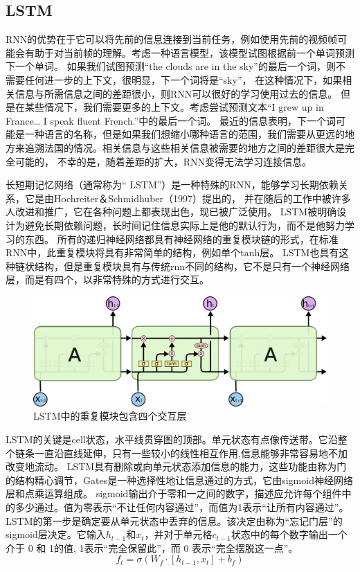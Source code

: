   
  \subsection{LSTM}
  RNN的优势在于它可以将先前的信息连接到当前任务，例如使用先前的视频帧可能会有助于对当前帧的理解。考虑一种语言模型，该模型试图根据前一个单词预测下一个单词。
  如果我们试图预测“the clouds are in the sky”的最后一个词，则不需要任何进一步的上下文，很明显，下一个词将是“sky”，
  在这种情况下，如果相关信息与所需信息之间的差距很小，则RNN可以很好的学习使用过去的信息。
  但是在某些情况下，我们需要更多的上下文。考虑尝试预测文本“I grew up in France… I speak fluent French.”中的最后一个词。
  最近的信息表明，下一个词可能是一种语言的名称，但是如果我们想缩小哪种语言的范围，我们需要从更远的地方来追溯法国的情况。相关信息与这些相关信息被需要的地方之间的差距很大是完全可能的，
不幸的是，随着差距的扩大，RNN变得无法学习连接信息。

长短期记忆网络（通常称为“ LSTM”）是一种特殊的RNN，能够学习长期依赖关系，它是由Hochreiter＆Schmidhuber（1997）提出的，
并在随后的工作中被许多人改进和推广，它在各种问题上都表现出色，现已被广泛使用。
LSTM被明确设计为避免长期依赖问题，长时间记住信息实际上是他的默认行为，而不是他努力学习的东西。
所有的递归神经网络都具有神经网络的重复模块链的形式，在标准RNN中，此重复模块将具有非常简单的结构，例如单个tanh层。
LSTM也具有这种链状结构，但是重复模块具有与传统rnn不同的结构，它不是只有一个神经网络层，而是有四个，以非常特殊的方式进行交互。

\begin{figure}[htbp]
  \centering
  \includegraphics[scale=0.5]{./images/LSTM.jpg}
  \caption{LSTM中的重复模块包含四个交互层}
  \label{fig:LSTM}
\end{figure}

LSTM的关键是cell状态，水平线贯穿图的顶部。单元状态有点像传送带。它沿整个链条一直沿直线延伸，只有一些较小的线性相互作用,信息能够非常容易地不加改变地流动。
LSTM具有删除或向单元状态添加信息的能力，这些功能由称为门的结构精心调节，Gates是一种选择性地让信息通过的方式，它由sigmoid神经网络层和点乘运算组成。
sigmoid输出介于零和一之间的数字，描述应允许每个组件中的多少通过。值为零表示“不让任何内容通过”，而值为1表示“让所有内容通过”。
LSTM的第一步是确定要从单元状态中丢弃的信息。该决定由称为“忘记门层”的sigmoid层决定。它输入$h_{t-1}$和$x_{t}$，并对于单元格$c_{t-1}$状态中的每个数字输出一个介于 0 和 1的值,
1表示“完全保留此”，而 0 表示“完全摆脱这一点”。
\begin{equation}
  f_{t}=σ(W_{f}\cdot[h_{t-1},x_t]+b_{f})
  \end{equation}

